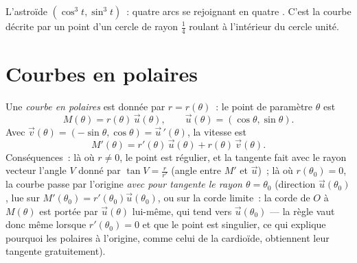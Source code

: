 \begin{omfigure}

{\small L'astroïde $(\cos^3 t, \sin^3 t)$~: quatre arcs se
rejoignant en quatre . C'est la courbe
décrite par un point d'un cercle de rayon $\frac14$ roulant à
l'intérieur du cercle unité.}
\end{omfigure}

\section{Courbes en polaires}

\begin{definition}\label{def:b1:curves:polar}
Une \emph{courbe en polaires} est donnée
par $r = r(\theta)$~: le point de paramètre $\theta$ est
\[
M(\theta) = r(\theta)\,\vec u(\theta),
\qquad \vec u(\theta) = (\cos\theta, \sin\theta).
\]
Avec $\vec v(\theta) = (-\sin\theta, \cos\theta) = \vec
u\,'(\theta)$, la vitesse est
\[
M'(\theta) = r'(\theta)\, \vec u(\theta) + r(\theta)\, \vec
v(\theta) .
\]
Conséquences~: là où $r \neq 0$, le point est régulier, et la
tangente fait avec le rayon vecteur l'angle $V$ donné par $\tan V =
\frac{r}{r'}$ (angle entre $M'$ et $\vec u$)~; là où $r(\theta_0)
= 0$, la courbe passe par l'origine \emph{avec pour tangente le
rayon $\theta = \theta_0$} (direction $\vec u(\theta_0)$, lue sur
$M'(\theta_0) = r'(\theta_0)\vec u(\theta_0)$, ou sur la corde
limite~: la corde de $O$ à $M(\theta)$ est portée par $\vec
u(\theta)$ lui-même, qui tend vers $\vec u(\theta_0)$ --- la règle
vaut donc même lorsque $r'(\theta_0) = 0$ et que le point est
singulier, ce qui explique pourquoi les 
polaires à l'origine, comme celui de la cardioïde, obtiennent leur
tangente gratuitement).
\end{definition}

